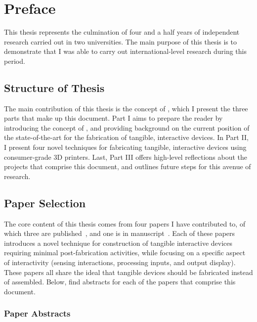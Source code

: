 \chapter*{Preface}\label{ch:preface}
  This thesis represents the culmination of four and a half years of independent
  research carried out in two universities. The main purpose of this thesis is
  to demonstrate that I was able to carry out international-level research
  during this period.

  \section*{Structure of Thesis}
    The main contribution of this thesis is the concept of \papf, which I
    present the three parts that make up this document. Part I aims to prepare
    the reader by introducing the concept of \papf, and providing background on
    the current position of the state-of-the-art for the fabrication of
    tangible, interactive devices. In Part II, I present four novel techniques
    for fabricating tangible, interactive devices using consumer-grade 3D
    printers. Last, Part III offers high-level reflections about the projects
    that comprise this document, and outlines future steps for this avenue of
    research.

  \section*{Paper Selection}
    The core content of this thesis comes from four papers I have contributed
    to, of which three are published~\cite{Tejada:2018, Tejada:2020, Kim:2021a},
    and one is in manuscript~\cite{Tejada:}. Each of these papers introduces a
    novel technique for construction of tangible interactive devices requiring
    minimal post-fabrication activities, while focusing on a specific aspect of
    interactivity (sensing interactions, processing inputs, and output display).
    These papers all share the \papf ideal that tangible devices should be
    fabricated instead of assembled. Below, find abstracts for each of the
    papers that comprise this document.

  \subsection*{Paper Abstracts}

